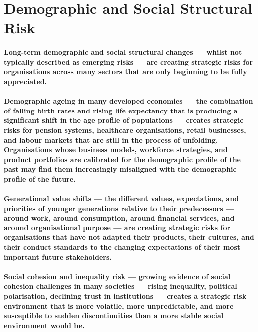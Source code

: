 \section{Demographic and Social Structural Risk}
\paragraph{Long-term demographic and social structural changes — whilst not typically described as emerging risks — are creating strategic risks for organisations across many sectors that are only beginning to be fully appreciated.}
\paragraph{\textbf{Demographic ageing} in many developed economies — the combination of falling birth rates and rising life expectancy that is producing a significant shift in the age profile of populations — creates strategic risks for pension systems, healthcare organisations, retail businesses, and labour markets that are still in the process of unfolding. Organisations whose business models, workforce strategies, and product portfolios are calibrated for the demographic profile of the past may find them increasingly misaligned with the demographic profile of the future.}
\paragraph{\textbf{Generational value shifts} — the different values, expectations, and priorities of younger generations relative to their predecessors — around work, around consumption, around financial services, and around organisational purpose — are creating strategic risks for organisations that have not adapted their products, their cultures, and their conduct standards to the changing expectations of their most important future stakeholders.}
\paragraph{\textbf{Social cohesion and inequality risk} — growing evidence of social cohesion challenges in many societies — rising inequality, political polarisation, declining trust in institutions — creates a strategic risk environment that is more volatile, more unpredictable, and more susceptible to sudden discontinuities than a more stable social environment would be.}

